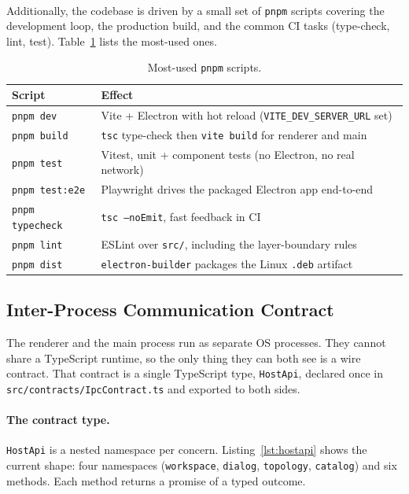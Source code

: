 \paragraph{}
Additionally, the codebase is driven by a small set of \texttt{pnpm} scripts covering the development loop, the production build, and the common CI tasks (type-check, lint, test). Table~\ref{tab:pnpm-scripts} lists the most-used ones.

\begin{table}[ht]
\centering
\caption[Most-used \texttt{pnpm} scripts.]{Most-used \texttt{pnpm} scripts.}
\label{tab:pnpm-scripts}
\footnotesize
\begin{tabular}{ll}
\toprule
\textbf{Script} & \textbf{Effect} \\
\midrule
\texttt{pnpm dev}        & Vite + Electron with hot reload (\texttt{VITE\_DEV\_SERVER\_URL} set) \\
\texttt{pnpm build}      & \texttt{tsc} type-check then \texttt{vite build} for renderer and main \\
\texttt{pnpm test}       & Vitest, unit + component tests (no Electron, no real network) \\
\texttt{pnpm test:e2e}   & Playwright drives the packaged Electron app end-to-end \\
\texttt{pnpm typecheck}  & \texttt{tsc --noEmit}, fast feedback in CI \\
\texttt{pnpm lint}       & ESLint over \texttt{src/}, including the layer-boundary rules \\
\texttt{pnpm dist}       & \texttt{electron-builder} packages the Linux \texttt{.deb} artifact \\
\bottomrule
\end{tabular}
\end{table}

\subsection{Inter-Process Communication Contract}
\label{sec:ipc-contract}

The renderer and the main process run as separate OS processes. They cannot share a TypeScript runtime, so the only thing they can both see is a wire contract. That contract is a single TypeScript type, \texttt{HostApi}, declared once in \texttt{src/contracts/IpcContract.ts} and exported to both sides.

\paragraph{The contract type.}
\texttt{HostApi} is a nested namespace per concern. Listing~\ref{lst:hostapi} shows the current shape: four namespaces (\texttt{workspace}, \texttt{dialog}, \texttt{topology}, \texttt{catalog}) and six methods. Each method returns a promise of a typed outcome.

